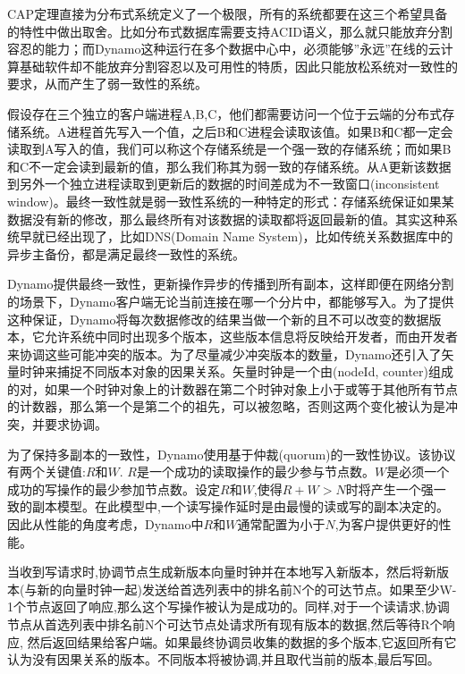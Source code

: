 CAP定理直接为分布式系统定义了一个极限，所有的系统都要在这三个希望具备的特性中做出取舍。比如分布式数据库需要支持ACID语义，那么就只能放弃分割容忍的能力；而Dynamo这种运行在多个数据中心中，必须能够”永远”在线的云计算基础软件却不能放弃分割容忍以及可用性的特质，因此只能放松系统对一致性的要求，从而产生了弱一致性的系统。

假设存在三个独立的客户端进程A,B,C，他们都需要访问一个位于云端的分布式存储系统。A进程首先写入一个值，之后B和C进程会读取该值。如果B和C都一定会读取到A写入的值，我们可以称这个存储系统是一个强一致的存储系统；而如果B和C不一定会读到最新的值，那么我们称其为弱一致的存储系统。从A更新该数据到另外一个独立进程读取到更新后的数据的时间差成为不一致窗口(inconsistent window)。最终一致性就是弱一致性系统的一种特定的形式：存储系统保证如果某数据没有新的修改，那么最终所有对该数据的读取都将返回最新的值。其实这种系统早就已经出现了，比如DNS(Domain Name System)，比如传统关系数据库中的异步主备份，都是满足最终一致性的系统。

Dynamo提供最终一致性，更新操作异步的传播到所有副本，这样即便在网络分割的场景下，Dynamo客户端无论当前连接在哪一个分片中，都能够写入。为了提供这种保证，Dynamo将每次数据修改的结果当做一个新的且不可以改变的数据版本，它允许系统中同时出现多个版本，这些版本信息将反映给开发者，而由开发者来协调这些可能冲突的版本。为了尽量减少冲突版本的数量，Dynamo还引入了矢量时钟来捕捉不同版本对象的因果关系。矢量时钟是一个由(nodeId, counter)组成的对，如果一个时钟对象上的计数器在第二个时钟对象上小于或等于其他所有节点的计数器，那么第一个是第二个的祖先，可以被忽略，否则这两个变化被认为是冲突，并要求协调。

为了保持多副本的一致性，Dynamo使用基于仲裁(quorum)的一致性协议。该协议有两个关键值:$R$和$W$. $R$是一个成功的读取操作的最少参与节点数。$W$是必须一个成功的写操作的最少参加节点数。设定$R$和$W$,使得$R+W>N$时将产生一个强一致的副本模型。在此模型中,一个读写操作延时是由最慢的读或写的副本决定的。因此从性能的角度考虑，Dynamo中$R$和$W$通常配置为小于$N$,为客户提供更好的性能。

当收到写请求时,协调节点生成新版本向量时钟并在本地写入新版本，然后将新版本(与新的向量时钟一起)发送给首选列表中的排名前N个的可达节点。如果至少W-1个节点返回了响应,那么这个写操作被认为是成功的。同样,对于一个读请求,协调节点从首选列表中排名前N个可达节点处请求所有现有版本的数据,然后等待R个响应, 然后返回结果给客户端。如果最终协调员收集的数据的多个版本,它返回所有它认为没有因果关系的版本。不同版本将被协调,并且取代当前的版本,最后写回。

